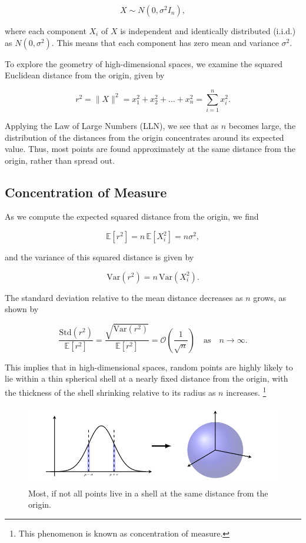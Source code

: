 \[
    X \sim N(0, \sigma^2 I_n),
\]

where each component $X_i$ of $X$ is independent and identically distributed (i.i.d.) as $N(0, \sigma^2)$. This means that each component has zero mean and variance $\sigma^2$.

To explore the geometry of high-dimensional spaces, we examine the squared Euclidean distance from the origin, given by

\[
    r^2 = \| X \|^2 = x_1^2 + x_2^2 + \dots + x_n^2 = \sum_{i=1}^n x_i^2.
\]

Applying the Law of Large Numbers (LLN), we see that as $n$ becomes large, the distribution of the distances from the origin concentrates around its expected value. Thus, most points are found approximately at the same distance from the origin, rather than spread out.

\subsection{Concentration of Measure}

As we compute the expected squared distance from the origin, we find

\[
    \mathbb{E}[r^2] = n \, \mathbb{E}[X_i^2] = n \sigma^2,
\]

and the variance of this squared distance is given by

\[
    \text{Var}(r^2) = n \, \text{Var}(X_i^2).
\]

The standard deviation relative to the mean distance decreases as $n$ grows, as shown by

\[
    \frac{\text{Std}(r^2)}{\mathbb{E}[r^2]} = \frac{\sqrt{\text{Var}(r^2)}}{\mathbb{E}[r^2]} = \mathcal{O}\left(\frac{1}{\sqrt{n}}\right) \quad \text{as} \quad n \to \infty.
\]

This implies that in high-dimensional spaces, random points are highly likely to lie within a thin spherical shell at a nearly fixed distance from the origin, with the thickness of the shell shrinking relative to its radius as $n$ increases. \footnote{This phenomenon is known as concentration of measure.}

\begin{figure}
    \centering
    \includegraphics[width=\linewidth]{img/life_hd_space.png}
    \caption{Most, if not all points live in a shell at the same distance from the origin.}
\end{figure}

